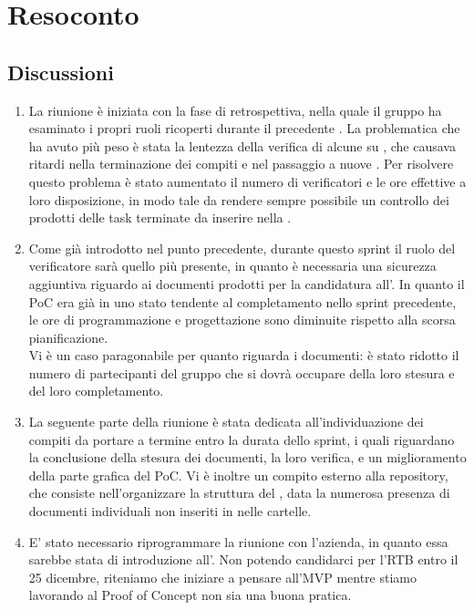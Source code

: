 \section{Resoconto} \label{sec:resoconto}
\subsection{Discussioni} \label{subsec:resdiscussione}
\begin{enumerate}
    \item La riunione è iniziata con la fase di retrospettiva, nella quale il gruppo ha esaminato i propri ruoli ricoperti durante il precedente . La problematica che ha avuto più peso è stata la lentezza della verifica di alcune  su , che causava ritardi nella terminazione dei compiti e nel passaggio a nuove . Per risolvere questo problema è stato aumentato il numero di verificatori e le ore effettive a loro disposizione, in modo tale da rendere sempre possibile un controllo dei prodotti delle task terminate da inserire nella .
    \item Come già introdotto nel punto precedente, durante questo sprint il ruolo del verificatore sarà quello più presente, in quanto è necessaria una sicurezza aggiuntiva  riguardo ai documenti prodotti per la candidatura all'. In quanto il PoC era già in uno stato tendente al completamento nello sprint precedente, le ore di programmazione e progettazione sono diminuite rispetto alla scorsa pianificazione.\\
    Vi è un caso paragonabile per quanto riguarda i documenti: è stato ridotto il numero di partecipanti del gruppo che si dovrà occupare della loro stesura e del loro completamento.  
    \item La seguente parte della riunione è stata dedicata all'individuazione dei compiti da portare a termine entro la durata dello sprint, i quali riguardano la conclusione della stesura dei documenti, la loro verifica, e un miglioramento della parte grafica del PoC. Vi è inoltre un compito esterno alla repository, che consiste nell'organizzare la struttura del , data la numerosa presenza di documenti individuali non inseriti in nelle cartelle. 
    \item E' stato necessario riprogrammare la riunione con l'azienda, in quanto essa sarebbe stata di introduzione all'. Non potendo candidarci per l'RTB entro il 25 dicembre, riteniamo che iniziare a pensare all'MVP mentre stiamo lavorando al Proof of Concept non sia una buona pratica.
\end{enumerate}

